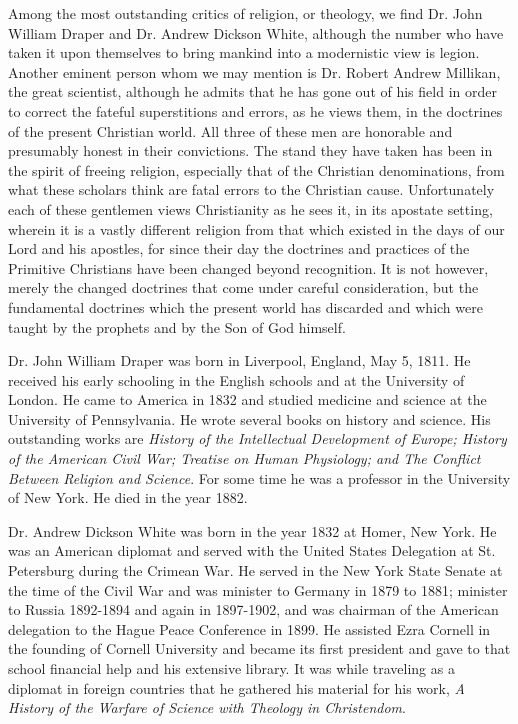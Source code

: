 Among the most outstanding critics of religion, or theology, we find Dr. John William
Draper and Dr. Andrew Dickson White, although the number who have taken it upon
themselves to bring mankind into a modernistic view is legion. Another eminent person
whom we may mention is Dr. Robert Andrew Millikan, the great scientist, although he
admits that he has gone out of his field in order to correct the fateful superstitions and errors,
as he views them, in the doctrines of the present Christian world. All three of these men are
honorable and presumably honest in their convictions. The stand they have taken has been in
the spirit of freeing religion, especially that of the Christian denominations, from what these
scholars think are fatal errors to the Christian cause. Unfortunately each of these gentlemen
views Christianity as he sees it, in its apostate setting, wherein it is a vastly different religion
from that which existed in the days of our Lord and his apostles, for since their day the
doctrines and practices of the Primitive Christians have been changed beyond recognition. It
is not however, merely the changed doctrines that come under careful consideration, but the
fundamental doctrines which the present world has discarded and which were taught by the
prophets and by the Son of God himself.

Dr. John William Draper was born in Liverpool, England, May 5, 1811. He received his early
schooling in the English schools and at the University of London. He came to America in
1832 and studied medicine and science at the University of Pennsylvania. He wrote several
books on history and science. His outstanding works are \textit{History of the Intellectual
Development of Europe; History of the American Civil War; Treatise on Human Physiology;
and The Conflict Between Religion and Science}. For some time he was a professor in the
University of New York. He died in the year 1882.

Dr. Andrew Dickson White was born in the year 1832 at Homer, New York. He was an
American diplomat and served with the United States Delegation at St. Petersburg during the
Crimean War. He served in the New York State Senate at the time of the Civil War and was
minister to Germany in 1879 to 1881; minister to Russia 1892-1894 and again in 1897-1902,
and was chairman of the American delegation to the Hague Peace Conference in 1899. He
assisted Ezra Cornell in the founding of Cornell University and became its first president and
gave to that school financial help and his extensive library. It was while traveling as a
diplomat in foreign countries that he gathered his material for his work, \textit{A History of the
Warfare of Science with Theology in Christendom}.

